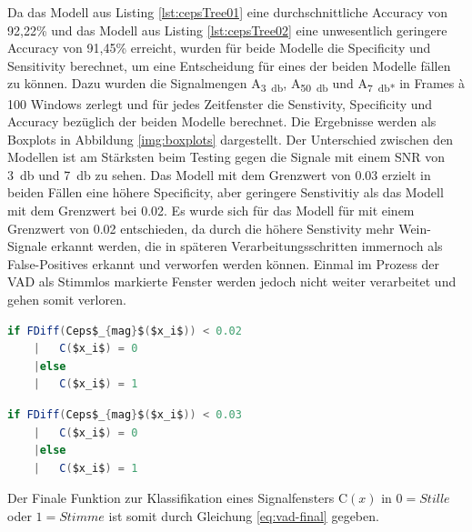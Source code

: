 Da das Modell aus Listing \ref{lst:cepsTree01} eine durchschnittliche Accuracy von 92,22\% und das Modell aus Listing \ref{lst:cepsTree02} eine unwesentlich geringere Accuracy von 91,45\% erreicht, wurden für beide Modelle die Specificity und Sensitivity berechnet, um eine Entscheidung für eines der beiden Modelle fällen zu können. Dazu wurden die Signalmengen A\textsubscript{\SI{3}{\decibel}}, A\textsubscript{\SI{50}{\decibel}} und A\textsubscript{\SI{7}{\decibel}*} in Frames à 100 Windows zerlegt und für jedes Zeitfenster die Senstivity, Specificity und Accuracy bezüglich der beiden Modelle berechnet. Die Ergebnisse werden als Boxplots in Abbildung \ref{img:boxplots} dargestellt. Der Unterschied zwischen den Modellen ist am Stärksten beim Testing gegen die Signale mit einem SNR von \SI{3}{\decibel} und \SI{7}{\decibel}  zu sehen. Das Modell mit dem Grenzwert von 0.03 erzielt in beiden Fällen eine höhere Specificity, aber geringere Senstivitiy als das Modell mit dem Grenzwert bei 0.02. Es wurde sich für das Modell für mit einem Grenzwert von 0.02 entschieden, da durch die höhere Senstivity mehr Wein-Signale erkannt werden, die in späteren Verarbeitungsschritten immernoch als False-Positives erkannt und verworfen werden können. Einmal im Prozess der VAD als Stimmlos markierte Fenster werden jedoch nicht weiter verarbeitet und gehen somit \glqq verloren\grqq. 

\begin{minipage}{\linewidth}
	\begin{lstlisting}[frame=single,mathescape=true,basicstyle=\footnotesize,language=Java,label=lst:cepsTree01,caption=Entscheidungsbaum für die VAD mit einem Cepstrum-Grenzwert von 0.02,linewidth=1\textwidth]
	if FDiff(Ceps$_{mag}$($x_i$)) < 0.02
	|   C($x_i$) = 0
	|else
	|   C($x_i$) = 1
	\end{lstlisting}
\end{minipage}

\begin{minipage}{\linewidth}
	\begin{lstlisting}[frame=single,mathescape=true,basicstyle=\footnotesize,language=Java,label=lst:cepsTree02,caption=Entscheidungsbaum für die VAD mit einem Cepstrum-Grenzwert von 0.03,linewidth=1\textwidth]
	if FDiff(Ceps$_{mag}$($x_i$)) < 0.03
	|   C($x_i$) = 0
	|else
	|   C($x_i$) = 1
	\end{lstlisting}
\end{minipage}

Der Finale Funktion zur Klassifikation eines Signalfensters C$(x)$ in $0 = Stille$ oder $1=Stimme$ ist somit durch Gleichung  \ref{eq:vad-final} gegeben.

